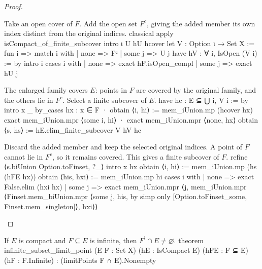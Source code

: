 \begin{proof}
  \begin{lean}{Take an open cover of $F$. Add the open set $F^{c}$, giving the added member its own index distinct from the original indices.}
    classical
    apply isCompact_of_finite_subcover
    intro ι U hU hcover
    let V : Option ι → Set X := fun i => match i with
      | none => Fᶜ
      | some j => U j
    have hV : ∀ i, IsOpen (V i) := by
      intro i
      cases i with
      | none => exact hF.isOpen_compl
      | some j => exact hU j
  \end{lean}

  \begin{lean}{The enlarged family covers $E$: points in $F$ are covered by the original family, and the others lie in $F^{c}$. Select a finite subcover of $E$.}
    have hc : E ⊆ ⋃ i, V i := by
      intro x _
      by_cases hx : x ∈ F
      · obtain ⟨i, hi⟩ := mem_iUnion.mp (hcover hx)
        exact mem_iUnion.mpr ⟨some i, hi⟩
      · exact mem_iUnion.mpr ⟨none, hx⟩
    obtain ⟨s, hs⟩ := hE.elim_finite_subcover V hV hc
  \end{lean}

  \begin{lean}{Discard the added member and keep the selected original indices. A point of $F$ cannot lie in $F^{c}$, so it remains covered. This gives a finite subcover of $F$.}
    refine ⟨s.biUnion Option.toFinset, ?_⟩
    intro x hx
    obtain ⟨i, hi⟩ := mem_iUnion.mp (hs (hFE hx))
    obtain ⟨his, hxi⟩ := mem_iUnion.mp hi
    cases i with
    | none => exact False.elim (hxi hx)
    | some j =>
      exact mem_iUnion.mpr ⟨j, mem_iUnion.mpr ⟨Finset.mem_biUnion.mpr ⟨some j, his, by simp only [Option.toFinset_some, Finset.mem_singleton]⟩, hxi⟩⟩
  \end{lean}

\end{proof}

\begin{theorem} \label{an1:thm:infinite-subset-of-compact-set-has-limit-point}
  \begin{lean}{If $E$ is compact and $F\subseteq E$ is infinite, then $F^{\prime}\cap E\ne\varnothing$.}
    theorem infinite_subset_limit_point (E F : Set X) (hE : IsCompact E)
        (hFE : F ⊆ E) (hF : F.Infinite) : (limitPoints F ∩ E).Nonempty
  \end{lean}
\end{theorem}

